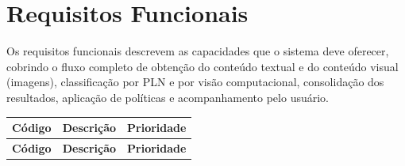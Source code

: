 \documentclass[
    12pt,           %
    oneside,        %
    a4paper,        %
    chapter=TITLE,  %
    english,        %
    brazil          %
]{abntex2}
\begin{document}
\section{Requisitos Funcionais}

Os requisitos funcionais descrevem as capacidades que o sistema deve
oferecer, cobrindo o fluxo completo de obtenção do conteúdo textual e do
conteúdo visual (imagens), classificação por PLN e por visão computacional,
consolidação dos resultados, aplicação de políticas e acompanhamento pelo
usuário.

\begin{longtable}{|p{1.6cm}|p{9.8cm}|p{2.3cm}|}
\hline
\textbf{Código} & \textbf{Descrição} & \textbf{Prioridade} \\ \hline
\endfirsthead
\hline
\textbf{Código} & \textbf{Descrição} & \textbf{Prioridade} \\ \hline
\endhead


\end{longtable}
\end{document}
